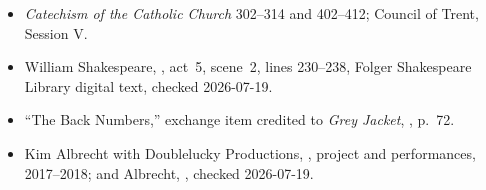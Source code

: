 \begin{deepstudy}
\begin{itemize}
\item \emph{Catechism of the Catholic Church} 302--314 and 402--412; Council of Trent, Session V.
\item William Shakespeare, , act~5, scene~2, lines 230--238, Folger Shakespeare Library digital text, checked 2026-07-19.
\item “The Back Numbers,” exchange item credited to \emph{Grey Jacket}, , p.~72.
\item Kim Albrecht with Doublelucky Productions, , project and performances, 2017--2018; and Albrecht, , checked 2026-07-19.
\end{itemize}



\clearpage

{\fontsize{7.2}{7.8}\selectfont
\setlength{\parskip}{0pt}

}

\end{deepstudy}

